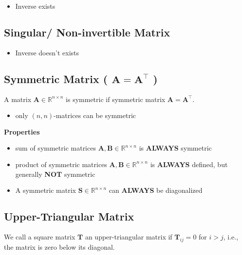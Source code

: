 \begin{itemize}
    \item Inverse exists
\end{itemize}


\subsection{Singular/ Non-invertible Matrix \cite{mfml-1}}\label{Singular/ Non-invertible Matrix}

\begin{itemize}
    \item Inverse doesn’t exists
\end{itemize}


\subsection{Symmetric Matrix ( $\mathbf{A = A^\top}$ ) \cite{mfml-1}}\label{Symmetric Matrix}
A matrix $\mathbf{A} \in \mathbb{R}^{n\times n}$ is symmetric if symmetric matrix $\mathbf{A = A^\top}$.

\begin{itemize}
    \item only $(n, n)$-matrices can be symmetric
\end{itemize}

\textbf{Properties}
\begin{itemize}
    \item sum of symmetric matrices $\mathbf{A, B} \in \mathbb{R}^{n\times n}$ is \textbf{ALWAYS} symmetric

    \item product of symmetric matrices $\mathbf{A, B} \in \mathbb{R}^{n\times n}$ is \textbf{ALWAYS} defined, but generally \textbf{NOT} symmetric

    \item A symmetric matrix $\mathbf{S} \in \mathbb{R}^{n\times n}$ can \textbf{ALWAYS} be diagonalized
\end{itemize}


\subsection{Upper-Triangular Matrix \cite{mfml-1}}\label{Upper-Triangular Matrix}
We call a square matrix $\mathbf{T}$ an upper-triangular matrix if $\mathbf{T}_{ij} = 0$ for $i > j$, i.e., the matrix is zero below its diagonal.

